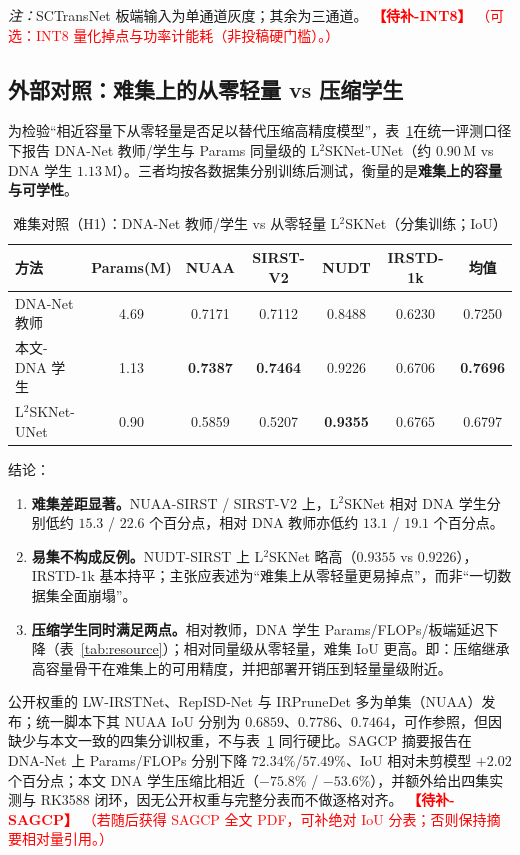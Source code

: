 \documentclass[lettersize,journal]{IEEEtran}
\newcommand{\ExpTodo}[2]{%
  \textcolor{red}{\textbf{【待补-#1】}}%
  \textcolor{red}{（#2）}%
}
\begin{document}
\noindent\textit{注：}SCTransNet 板端输入为单通道灰度；其余为三通道。
\ExpTodo{INT8}{可选：INT8 量化掉点与功率计能耗（非投稿硬门槛）。}

\subsection{外部对照：难集上的从零轻量 vs 压缩学生}
\label{sec:h1_hard}

为检验“相近容量下从零轻量是否足以替代压缩高精度模型”，表~\ref{tab:h1_hard}在统一评测口径下报告 DNA-Net 教师/学生与 Params 同量级的 L$^2$SKNet-UNet\cite{L2SKNet2025}（约 $0.90$\,M vs DNA 学生 $1.13$\,M）。三者均按各数据集分别训练后测试，衡量的是\textbf{难集上的容量与可学性}。

\begin{table}[!t]
\renewcommand{\arraystretch}{1.12}
\caption{难集对照（H1）：DNA-Net 教师/学生 vs 从零轻量 L$^2$SKNet（分集训练；IoU）}
\label{tab:h1_hard}
\centering
\begin{tabular}{@{}lcccccc@{}}
\toprule
方法 & Params(M) & NUAA & SIRST-V2 & NUDT & IRSTD-1k & 均值 \\
\midrule
DNA-Net 教师 & 4.69 & 0.7171 & 0.7112 & 0.8488 & 0.6230 & 0.7250 \\
本文-DNA 学生 & 1.13 & \textbf{0.7387} & \textbf{0.7464} & 0.9226 & 0.6706 & \textbf{0.7696} \\
\midrule
L$^2$SKNet-UNet & 0.90 & 0.5859 & 0.5207 & \textbf{0.9355} & 0.6765 & 0.6797 \\
\bottomrule
\end{tabular}
\end{table}

结论：
\begin{enumerate}
\item \textbf{难集差距显著。}NUAA-SIRST / SIRST-V2 上，L$^2$SKNet 相对 DNA 学生分别低约 $15.3$ / $22.6$ 个百分点，相对 DNA 教师亦低约 $13.1$ / $19.1$ 个百分点。
\item \textbf{易集不构成反例。}NUDT-SIRST 上 L$^2$SKNet 略高（$0.9355$ vs $0.9226$），IRSTD-1k 基本持平；主张应表述为“难集上从零轻量更易掉点”，而非“一切数据集全面崩塌”。
\item \textbf{压缩学生同时满足两点。}相对教师，DNA 学生 Params/FLOPs/板端延迟下降（表~\ref{tab:resource}）；相对同量级从零轻量，难集 IoU 更高。即：压缩继承高容量骨干在难集上的可用精度，并把部署开销压到轻量量级附近。
\end{enumerate}

公开权重的 LW-IRSTNet\cite{LWIRSTNet2023}、RepISD-Net\cite{RepISDNet2023} 与 IRPruneDet\cite{IRPruneDet2024} 多为单集（NUAA）发布；统一脚本下其 NUAA IoU 分别为 $0.6859$、$0.7786$、$0.7464$，可作参照，但因缺少与本文一致的四集分训权重，不与表~\ref{tab:h1_hard} 同行硬比。SAGCP\cite{SAGCP2025} 摘要报告在 DNA-Net 上 Params/FLOPs 分别下降 $72.34\%$/$57.49\%$、IoU 相对未剪模型 $+2.02$ 个百分点；本文 DNA 学生压缩比相近（$-75.8\%$ / $-53.6\%$），并额外给出四集实测与 RK3588 闭环，因无公开权重与完整分表而不做逐格对齐。
\ExpTodo{SAGCP}{若随后获得 SAGCP 全文 PDF，可补绝对 IoU 分表；否则保持摘要相对量引用。}
\end{document}
